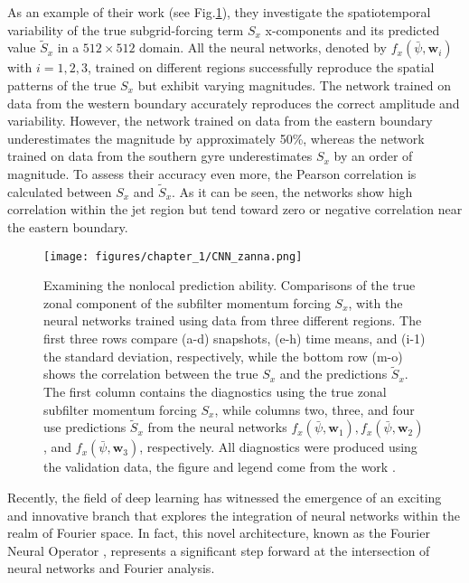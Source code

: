 As an example of their work (see Fig.\ref{C1 - FIG - CNN predictions of subgrid-term x-components}), they investigate the spatiotemporal variability of the true subgrid-forcing term $S_x$ x-components and its predicted value $\tilde{S}_x$ in a $512 \times 512$ domain. All the neural networks, denoted by $f_x\left(\bar{\psi}, \mathbf{w}_i\right)$ with $i = 1, 2 ,3$, trained on different regions successfully reproduce the spatial patterns of the true $S_x$ but exhibit varying magnitudes. The network trained on data from the western boundary accurately reproduces the correct amplitude and variability. However, the network trained on data from the eastern boundary underestimates the magnitude by approximately 50\%, whereas the network trained on data from the southern gyre underestimates $S_x$ by an order of magnitude. To assess their accuracy even more, the Pearson correlation is calculated between $S_x$ and $\tilde{S}_x$. As it can be seen, the networks show high correlation within the jet region but tend toward zero or negative correlation near the eastern boundary.

\newpage

\begin{figure}[!h]
    \centering
    \texttt{[image: figures/chapter\_1/CNN\_zanna.png]}
    \caption{Examining the nonlocal prediction ability. Comparisons of the true zonal component of the subfilter momentum forcing $S_x$, with the neural networks trained using data from three different regions. The first three rows compare (a-d) snapshots, (e-h) time means, and (i-1) the standard deviation, respectively, while the bottom row (m-o) shows the correlation between the true $S_x$ and the predictions $\tilde{S}_x$. The first column contains the diagnostics using the true zonal subfilter momentum forcing $S_x$, while columns two, three, and four use predictions $\tilde{S}_x$ from the neural networks $f_x\left(\bar{\psi}, \mathbf{w}_1\right), f_x\left(\bar{\psi}, \mathbf{w}_2\right)$, and $f_x\left(\bar{\psi}, \mathbf{w}_3\right)$, respectively. All diagnostics were produced using the validation data, the figure and legend come from the work \cite{FCNN1}.}
    \label{C1 - FIG - CNN predictions of subgrid-term x-components}
\end{figure}

\newpage

Recently, the field of deep learning has witnessed the emergence of an exciting and innovative branch that explores the integration of neural networks within the realm of Fourier space. In fact, this novel architecture, known as the Fourier Neural Operator \citep{FNO}, represents a significant step forward at the intersection of neural networks and Fourier analysis.\\


